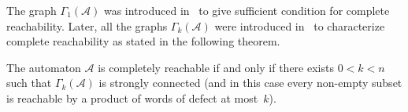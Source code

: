 The graph $\Gamma_1(\mathcal A)$ was introduced in~\cite{BondarV16}
to give sufficient condition for complete reachability.
Later, all the graphs $\Gamma_k(\mathcal A)$ were introduced in~\cite{BondarV18,BondarCV23} to characterize 
complete reachability as stated in the following theorem.

\begin{theorem}
	\label{sync_max:thm:char_compl_reach}
	The automaton $\mathcal A$ is completely reachable 
	if and only if there exists 
	$0 < k < n$ such that $\Gamma_k(\mathcal A)$ is strongly connected (and in this case every non-empty subset
	is reachable by a product of words of defect at most~$k$).
\end{theorem}

